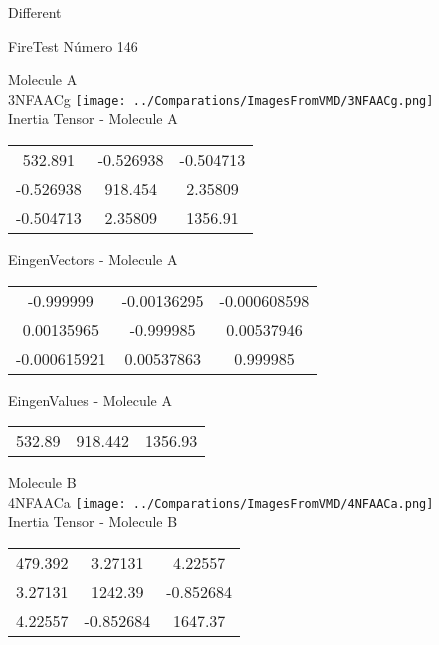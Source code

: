 \begin{center}
\vtab
\vtab
\textcolor{NavyBlue}{\Large Different}
\end{center}

 \newpage

\vtab[-2cm]
\begin{center}
{\large FireTest \tab Número 146}
\end{center}
\begin{multicols}{2}
\begin{center}

Molecule A \\ 
3NFAACg
\texttt{[image: ../Comparations/ImagesFromVMD/3NFAACg.png]}
\\
Inertia Tensor - Molecule A \\
\vtab

\begin{tabular}{|c c c|}
532.891	 & 	-0.526938	 & 	-0.504713	 \\
-0.526938	 & 	918.454	 & 	2.35809	 \\
-0.504713	 & 	2.35809	 & 	1356.91
\end{tabular}

\vtab
 EingenVectors - Molecule A     \\
\vtab
\begin{tabular}{|c c c|}
-0.999999	 & 	-0.00136295	 & 	-0.000608598	 \\
0.00135965	 & 	-0.999985	 & 	0.00537946	 \\
-0.000615921	 & 	0.00537863	 & 	0.999985
\end{tabular}

\vtab
 EingenValues - Molecule A     \\
\vtab
\begin{tabular}{|c c c|}
532.89	 & 	918.442	 & 	1356.93	 \\
\end{tabular}
\columnbreak

Molecule B \\ 
4NFAACa
\texttt{[image: ../Comparations/ImagesFromVMD/4NFAACa.png]}
\\
Inertia Tensor - Molecule B \\
\vtab

\begin{tabular}{|c c c|}
479.392	 & 	3.27131	 & 	4.22557	 \\
3.27131	 & 	1242.39	 & 	-0.852684	 \\
4.22557	 & 	-0.852684	 & 	1647.37
\end{tabular}


\end{center}
\end{multicols}
